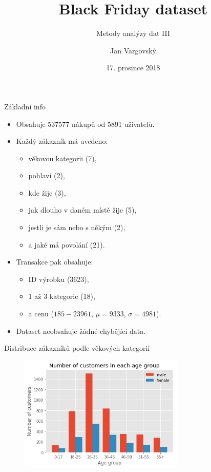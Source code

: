 \documentclass[11pt]{beamer}
\author{Jan Vargovský}
\title{Black Friday dataset}
\subtitle{Metody analýzy dat III}
\institute{Katedra informatiky, FEI, VŠB-TU Ostrava}
\date{17. prosince 2018}
\begin{document}
\begin{frame}
\titlepage
\end{frame}

\begin{frame}{Základní info}
\begin{itemize}
	\item Obsahuje \alert{537577} nákupů od \alert{5891} uživatelů.
	\item Každý zákazník má uvedeno:
		\begin{itemize}
			\item věkovou kategorii (7),
			\item pohlaví (2),
			\item kde žije (3),
			\item jak dlouho v daném místě žije (5),
			\item jestli je sám nebo s někým (2),
			\item a jaké má povolání (21).
		\end{itemize}
	\item Transakce pak obsahuje:
		\begin{itemize}
			\item ID výrobku (3623),
			\item 1 až 3 kategorie (18),
			\item a cenu ($185 - 23961$, $\mu=9333$, $\sigma=4981$).
		\end{itemize}	
	\item Dataset neobsahuje žádné chybějící data.	
\end{itemize}
\end{frame}

\begin{frame}{Distribuce zákazníků podle věkových kategorií}
\begin{figure}
	\includegraphics[width=0.7\textwidth,keepaspectratio]{black-friday_8_0}
\end{figure}
\end{frame}
\end{document}

